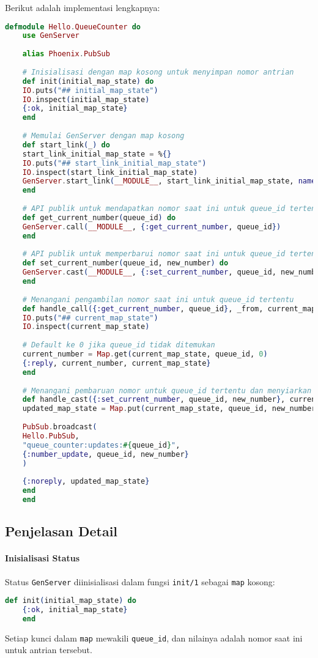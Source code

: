 Berikut adalah implementasi lengkapnya:

\begin{lstlisting}[language=Elixir, caption={lib/hello/queue\_counter.ex}]
	defmodule Hello.QueueCounter do
	use GenServer
	
	alias Phoenix.PubSub
	
	# Inisialisasi dengan map kosong untuk menyimpan nomor antrian
	def init(initial_map_state) do
	IO.puts("## initial_map_state")
	IO.inspect(initial_map_state)
	{:ok, initial_map_state}
	end
	
	# Memulai GenServer dengan map kosong
	def start_link(_) do
	start_link_initial_map_state = %{}
	IO.puts("## start_link_initial_map_state")
	IO.inspect(start_link_initial_map_state)
	GenServer.start_link(__MODULE__, start_link_initial_map_state, name: __MODULE__)
	end
	
	# API publik untuk mendapatkan nomor saat ini untuk queue_id tertentu
	def get_current_number(queue_id) do
	GenServer.call(__MODULE__, {:get_current_number, queue_id})
	end
	
	# API publik untuk memperbarui nomor saat ini untuk queue_id tertentu
	def set_current_number(queue_id, new_number) do
	GenServer.cast(__MODULE__, {:set_current_number, queue_id, new_number})
	end
	
	# Menangani pengambilan nomor saat ini untuk queue_id tertentu
	def handle_call({:get_current_number, queue_id}, _from, current_map_state) do
	IO.puts("## current_map_state")
	IO.inspect(current_map_state)
	
	# Default ke 0 jika queue_id tidak ditemukan
	current_number = Map.get(current_map_state, queue_id, 0)
	{:reply, current_number, current_map_state}
	end
	
	# Menangani pembaruan nomor untuk queue_id tertentu dan menyiarkan pembaruan
	def handle_cast({:set_current_number, queue_id, new_number}, current_map_state) do
	updated_map_state = Map.put(current_map_state, queue_id, new_number)
	
	PubSub.broadcast(
	Hello.PubSub,
	"queue_counter:updates:#{queue_id}",
	{:number_update, queue_id, new_number}
	)
	
	{:noreply, updated_map_state}
	end
	end
\end{lstlisting}

\subsection{Penjelasan Detail}

\paragraph{Inisialisasi Status}
Status \texttt{GenServer} diinisialisasi dalam fungsi \texttt{init/1} sebagai \texttt{map} kosong:
\begin{lstlisting}[language=Elixir]
	def init(initial_map_state) do
	{:ok, initial_map_state}
	end
\end{lstlisting}
Setiap kunci dalam \texttt{map} mewakili \texttt{queue\_id}, dan nilainya adalah nomor saat ini untuk antrian tersebut.

